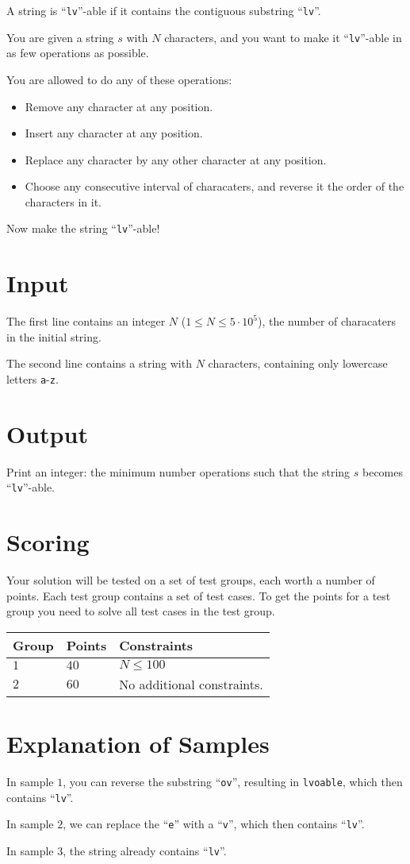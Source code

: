 \noindent
A string is ``\texttt{lv}''-able if it contains the contiguous substring ``\texttt{lv}''.

You are given a string $s$ with $N$ characters, and you want to make it ``\texttt{lv}''-able in as few operations as possible.

You are allowed to do any of these operations:
\begin{itemize}
  \item Remove any character at any position.
  \item Insert any character at any position.
  \item Replace any character by any other character at any position.
  \item Choose any consecutive interval of characaters, and reverse it the order of the characters in it.
\end{itemize}

Now make the string ``\texttt{lv}''-able!

\section*{Input}
The first line contains an integer $N$ ($1 \leq N \leq 5 \cdot 10^5$), the number of characaters in the initial string.

The second line contains a string with $N$ characters, containing only lowercase letters \texttt{a}-\texttt{z}.

\section*{Output}
Print an integer: the minimum number operations such that the string $s$ becomes ``\texttt{lv}''-able.

\section*{Scoring}
Your solution will be tested on a set of test groups, each worth a number of points. Each test group contains
a set of test cases. To get the points for a test group you need to solve all test cases in the test group.

\noindent
\begin{tabular}{| l | l | p{12cm} |}
  \hline
  \textbf{Group} & \textbf{Points} & \textbf{Constraints} \\ \hline
  $1$    & $40$       & $N \leq 100$ \\ \hline
  $2$    & $60$       & No additional constraints. \\ \hline
\end{tabular}

\section*{Explanation of Samples}
In sample $1$, you can reverse the substring ``\texttt{ov}'', resulting in \texttt{lvoable}, which then contains
``\texttt{lv}''.

In sample $2$, we can replace the ``\texttt{e}'' with a ``\texttt{v}'', which then contains ``\texttt{lv}''.

In sample $3$, the string already contains ``\texttt{lv}''.
